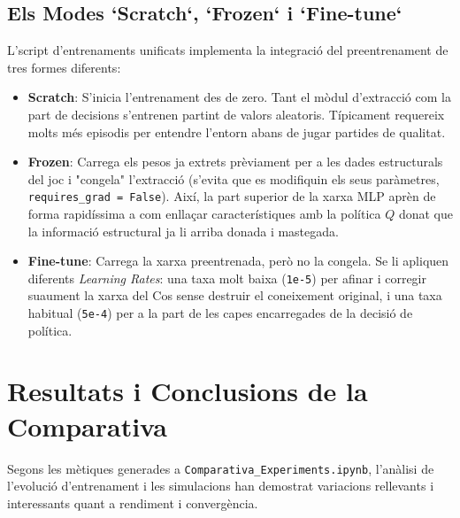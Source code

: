 \documentclass[a4paper,11pt]{article}
\begin{document}
\subsection{Els Modes `Scratch`, `Frozen` i `Fine-tune`}
L'script d'entrenaments unificats implementa la integració del preentrenament de tres formes diferents:
\begin{itemize}
    \item \textbf{Scratch}: S'inicia l'entrenament des de zero. Tant el mòdul d'extracció com la part de decisions s'entrenen partint de valors aleatoris. Típicament requereix molts més episodis per entendre l'entorn abans de jugar partides de qualitat.
    \item \textbf{Frozen}: Carrega els pesos ja extrets prèviament per a les dades estructurals del joc i "congela" l'extracció (s'evita que es modifiquin els seus paràmetres, \texttt{requires\_grad = False}). Així, la part superior de la xarxa MLP aprèn de forma rapidíssima a com enllaçar característiques amb la política $Q$ donat que la informació estructural ja li arriba donada i mastegada.
    \item \textbf{Fine-tune}: Carrega la xarxa preentrenada, però no la congela. Se li apliquen diferents \textit{Learning Rates}: una taxa molt baixa (\texttt{1e-5}) per afinar i corregir suaument la xarxa del Cos sense destruir el coneixement original, i una taxa habitual (\texttt{5e-4}) per a la part de les capes encarregades de la decisió de política.
\end{itemize}


\section{Resultats i Conclusions de la Comparativa}
Segons les mètiques generades a \texttt{Comparativa\_Experiments.ipynb}, l'anàlisi de l'evolució d'entrenament i les simulacions han demostrat variacions rellevants i interessants quant a rendiment i convergència.
\end{document}
